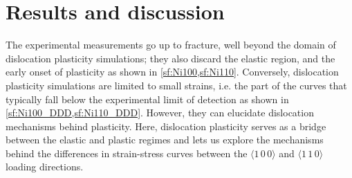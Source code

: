 \section{Results and discussion}
\label{s:NiResults}

The experimental measurements go up to fracture, well beyond the domain of dislocation plasticity simulations; they also discard the elastic region, and the early onset of plasticity as shown in \cref{sf:Ni100,sf:Ni110}. Conversely, dislocation plasticity simulations are limited to small strains, i.e. the part of the curves that typically fall below the experimental limit of detection as shown in \cref{sf:Ni100_DDD,sf:Ni110_DDD}. However, they can elucidate dislocation mechanisms behind plasticity. Here, dislocation plasticity serves as a bridge between the elastic and plastic regimes and lets us explore the mechanisms behind the differences in strain-stress curves between the $\langle 1\,0\,0 \rangle$ and $\langle 1\,1\,0 \rangle$ loading directions.
